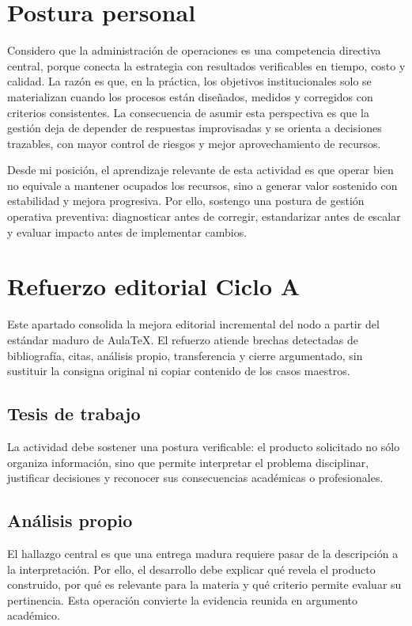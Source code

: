 \documentclass[
	spanish,
	letterpaper, oneside
]{article}
\begin{document}
\section{Postura personal}

Considero que la administración de operaciones es una competencia directiva central, porque conecta la estrategia con resultados verificables en tiempo, costo y calidad. La razón es que, en la práctica, los objetivos institucionales solo se materializan cuando los procesos están diseñados, medidos y corregidos con criterios consistentes. La consecuencia de asumir esta perspectiva es que la gestión deja de depender de respuestas improvisadas y se orienta a decisiones trazables, con mayor control de riesgos y mejor aprovechamiento de recursos.

Desde mi posición, el aprendizaje relevante de esta actividad es que operar bien no equivale a mantener ocupados los recursos, sino a generar valor sostenido con estabilidad y mejora progresiva. Por ello, sostengo una postura de gestión operativa preventiva: diagnosticar antes de corregir, estandarizar antes de escalar y evaluar impacto antes de implementar cambios.

\section*{Refuerzo editorial Ciclo A}
Este apartado consolida la mejora editorial incremental del nodo a partir del estándar maduro de AulaTeX. El refuerzo atiende brechas detectadas de bibliografía, citas, análisis propio, transferencia y cierre argumentado, sin sustituir la consigna original ni copiar contenido de los casos maestros.

\subsection*{Tesis de trabajo}
La actividad debe sostener una postura verificable: el producto solicitado no sólo organiza información, sino que permite interpretar el problema disciplinar, justificar decisiones y reconocer sus consecuencias académicas o profesionales.

\subsection*{Análisis propio}
El hallazgo central es que una entrega madura requiere pasar de la descripción a la interpretación. Por ello, el desarrollo debe explicar qué revela el producto construido, por qué es relevante para la materia y qué criterio permite evaluar su pertinencia. Esta operación convierte la evidencia reunida en argumento académico.
\end{document}
